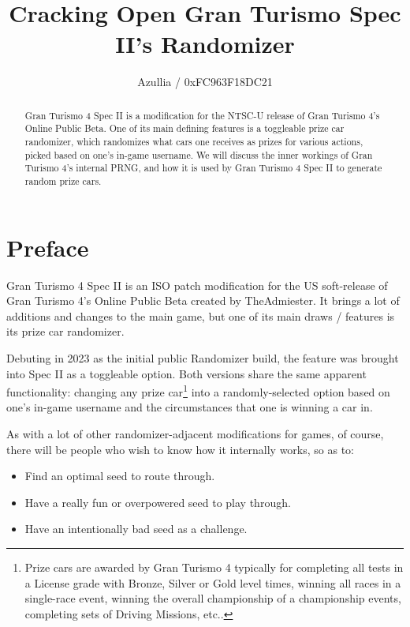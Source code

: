 \documentclass[12pt,a4paper,notitlepage]{extarticle}
\author{Azullia / 0xFC963F18DC21}
\title{\textbf{\huge{Cracking Open Gran Turismo Spec II's Randomizer}}}
\begin{document}
    \maketitle

    \begin{abstract}
        Gran Turismo 4 Spec II is a modification for the NTSC-U release of Gran Turismo 4's
        Online Public Beta. One of its main defining features is a toggleable prize car
        randomizer, which randomizes what cars one receives as prizes for various actions,
        picked based on one's in-game username. We will discuss the inner workings of Gran
        Turismo 4's internal PRNG, and how it is used by Gran Turismo 4 Spec II to generate
        random prize cars.
    \end{abstract}

    \section*{Preface}
        Gran Turismo 4 Spec II is an ISO patch modification for the US soft-release of
        Gran Turismo 4's Online Public Beta created by TheAdmiester. It brings a lot of
        additions and changes to the main game, but one of its main draws / features is
        its prize car randomizer.

        Debuting in 2023 as the initial public Randomizer build, the feature was brought into
        Spec II as a toggleable option. Both versions share the same apparent functionality:
        changing any prize car\footnote{Prize cars are awarded by Gran Turismo 4 typically for
        completing all tests in a License grade with Bronze, Silver or Gold level times,
        winning all races in a single-race event, winning the overall championship of a
        championship events, completing sets of Driving Missions, etc..} into a
        randomly-selected option based on one's in-game username and the circumstances that one
        is winning a car in.

        As with a lot of other randomizer-adjacent modifications for games, of course, there
        will be people who wish to know how it internally works, so as to:

        \begin{itemize}
            \item Find an optimal seed to route through.
            \item Have a really fun or overpowered seed to play through.
            \item Have an intentionally bad seed as a challenge.
        \end{itemize}
\end{document}
